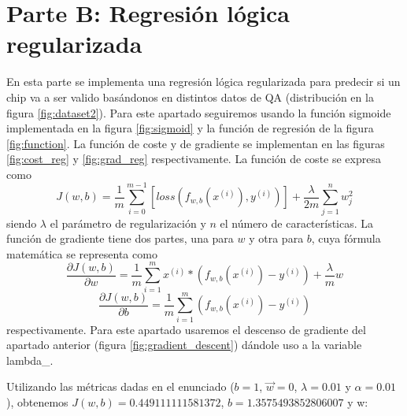 \documentclass[6pt]{../../shared/AiTex}
\begin{document}
\section{Parte B: Regresión lógica regularizada}

En esta parte se implementa una regresión lógica regularizada para predecir si un chip va a ser valido basándonos en distintos datos de QA (distribución en la figura \ref{fig:dataset2}). Para este apartado seguiremos usando la función sigmoide implementada en la figura \ref{fig:sigmoid} y la función de regresión de la figura \ref{fig:function}. La función de coste y de gradiente se implementan en las figuras \ref{fig:cost_reg} y \ref{fig:grad_reg} respectivamente. La función de coste se expresa como \[J(w,b) = \frac{1}{m} \sum_{i=0}^{m -1} [loss(f_{w,b}(x^{(i)}),y^{(i)})] + \frac{\lambda}{2m} \sum_{j=1}^{n} w_j^2\] siendo $\lambda$ el parámetro de regularización y $n$ el número de características. La función de gradiente tiene dos partes, una para $w$ y otra para $b$, cuya fórmula matemática se representa como \[\frac{\partial J(w,b)}{\partial w} = \frac{1}{m} \sum_{i=1}^{m} x^{(i)} * (f_{w,b}(x^{(i)}) - y^{(i)}) + \frac{\lambda}{m} w\] \[\frac{\partial J(w,b)}{\partial b} = \frac{1}{m} \sum_{i=1}^{m} (f_{w,b}(x^{(i)}) - y^{(i)})\] respectivamente. Para este apartado usaremos el descenso de gradiente del apartado anterior (figura \ref{fig:gradient_descent}) dándole uso a la variable lambda\_.

Utilizando las métricas dadas en el enunciado ($b = 1$, $\vec{w} = 0$, $\lambda = 0.01$ y $\alpha = 0.01$), obtenemos $J(w,b) = 0.449111111581372$, $b = 1.3575493852806007$ y w:
\end{document}

